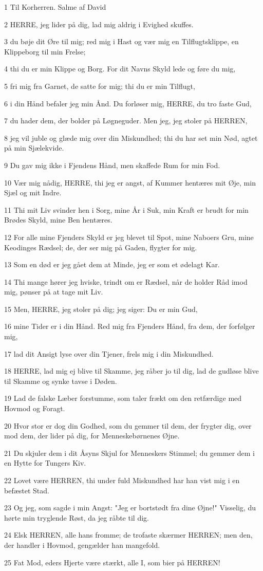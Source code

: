 \par 1 Til Korherren. Salme af David
\par 2 HERRE, jeg lider på dig, lad mig aldrig i Evighed skuffes.
\par 3 du bøje dit Øre til mig; red mig i Hast og vær mig en Tilflugtsklippe, en Klippeborg til min Frelse;
\par 4 thi du er min Klippe og Borg. For dit Navns Skyld lede og føre du mig,
\par 5 fri mig fra Garnet, de satte for mig; thi du er min Tilflugt,
\par 6 i din Hånd befaler jeg min Ånd. Du forløser mig, HERRE, du tro faste Gud,
\par 7 du hader dem, der bolder på Løgneguder. Men jeg, jeg stoler på HERREN,
\par 8 jeg vil juble og glæde mig over din Miskundhed; thi du har set min Nød, agtet på min Sjælekvide.
\par 9 Du gav mig ikke i Fjendens Hånd, men skaffede Rum for min Fod.
\par 10 Vær mig nådig, HERRE, thi jeg er angst, af Kummer hentæres mit Øje, min Sjæl og mit Indre.
\par 11 Thi mit Liv svinder hen i Sorg, mine År i Suk, min Kraft er brudt for min Brødes Skyld, mine Ben hentæres.
\par 12 For alle mine Fjenders Skyld er jeg blevet til Spot, mine Naboers Gru, mine Keodinges Rædsel; de, der ser mig på Gaden, flygter for mig.
\par 13 Som en død er jeg gået dem at Minde, jeg er som et ødelagt Kar.
\par 14 Thi mange hører jeg hviske, trindt om er Rædsel, når de holder Råd imod mig, pønser på at tage mit Liv.
\par 15 Men, HERRE, jeg stoler på dig; jeg siger: Du er min Gud,
\par 16 mine Tider er i din Hånd. Red mig fra Fjenders Hånd, fra dem, der forfølger mig,
\par 17 lad dit Ansigt lyse over din Tjener, frels mig i din Miskundhed.
\par 18 HERRE, lad mig ej blive til Skamme, jeg råber jo til dig, lad de gudløse blive til Skamme og synke tavse i Døden.
\par 19 Lad de falske Læber forstumme, som taler frækt om den retfærdige med Hovmod og Foragt.
\par 20 Hvor stor er dog din Godhed, som du gemmer til dem, der frygter dig, over mod dem, der lider på dig, for Menneskebørnenes Øjne.
\par 21 Du skjuler dem i dit Åsyns Skjul for Menneskers Stimmel; du gemmer dem i en Hytte for Tungers Kiv.
\par 22 Lovet være HERREN, thi under fuld Miskundhed har han vist mig i en befæstet Stad.
\par 23 Og jeg, som sagde i min Angst: "Jeg er bortstødt fra dine Øjne!" Visselig, du hørte min tryglende Røst, da jeg råbte til dig.
\par 24 Elsk HERREN, alle hans fromme; de trofaste skærmer HERREN; men den, der handler i Hovmod, gengælder han mangefold.
\par 25 Fat Mod, eders Hjerte være stærkt, alle I, som bier på HERREN!

